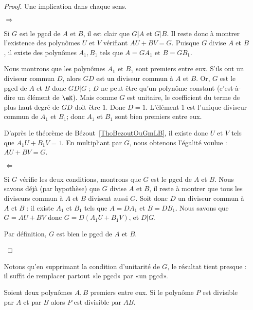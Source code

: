 \begin{proof}
	Une implication dans chaque sens.

	\begin{subproof}
		\item[\( \Rightarrow\)]

		Si \( G\) est le pgcd de \( A\) et \( B\), il est clair que \( G|A\) et \( G|B\).  Il reste donc à montrer l'existence des polynômes \( U\) et \( V\) vérifiant \( AU+BV=G\). Puisque \( G\) divise \( A\) et \( B\), il existe des polynômes \( A_1,B_1\) tels que \( A=GA_1\) et \( B=GB_1\).

		Nous montrons que les polynômes \( A_1\) et \( B_1\) sont premiers entre eux. S'ils ont un diviseur commun \( D\), alors \( GD\) est un diviseur commun à \( A\) et \( B\).  Or, \( G\) est le pgcd de \( A\) et \( B\) donc \( GD|G\) ; \( D\) ne peut être qu'un polynôme constant (c'est-à-dire un élément de \( \eK\)). Mais comme \( G\) est unitaire, le coefficient du terme de plus haut degré de \( GD\) doit être \( 1\). Donc \( D=1\).  L'élément \( 1\) est l'unique diviseur commun de \( A_1\) et \( B_1\); donc \( A_1\) et \( B_1\) sont bien premiers entre eux.

		D'après le théorème de Bézout~\ref{ThoBezoutOuGmLB}, il existe donc \( U\) et \( V\) tels que \( A_1U+B_1V=1\). En multipliant par \( G\), nous obtenons l'égalité voulue : \( AU+BV=G\).

		\item[\( \Leftarrow\)]

		Si \( G\) vérifie les deux conditions, montrons que \( G\) est le pgcd de \( A\) et \( B\). Nous savons déjà (par hypothèse) que \( G\) divise \( A\) et \( B\), il reste à montrer que tous les diviseurs commun à \( A\) et \( B\) divisent aussi \( G\). Soit donc \( D\) un diviseur commun à \( A\) et \( B\) : il existe \( A_1\) et \( B_1\) tels que \( A=DA_1\) et \( B=DB_1\). Nous savons que \( G=AU+BV\) donc \( G=D(A_1U+B_1V)\), et \( D|G\).

		Par définition, \( G\) est bien le pgcd de \( A\) et \( B\).
	\end{subproof}
\end{proof}
Notons qu'en supprimant la condition d'unitarité de \( G\), le résultat tient presque : il suffit de remplacer partout «le pgcd» par «un pgcd».

\begin{lemma}       \label{LEMooGNAMooXRpgBn}
	Soient deux polynômes \( A,B\) premiers entre eux. Si le polynôme \( P\) est divisible par \( A\) et par \( B\) alors \( P\) est divisible par \( AB\).
\end{lemma}

